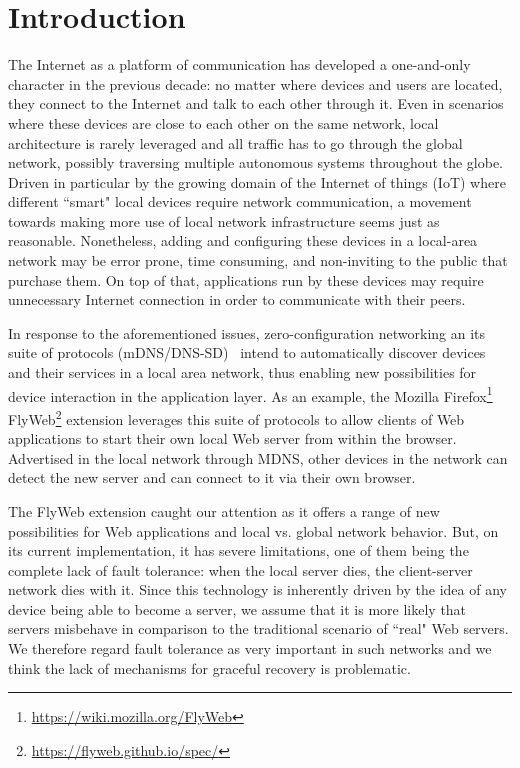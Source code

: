 \section{Introduction}
\label{sec:introduction}

 

The Internet as a platform of communication has developed a one-and-only character in the previous decade: no matter where devices and users are located, they connect to the Internet and talk to each other through it. Even in scenarios where these devices are close to each other on the same network, local architecture is rarely leveraged and all traffic has to go through the global network, possibly traversing multiple autonomous systems throughout the globe. Driven in particular by the growing domain of the Internet of things (IoT) where different ``smart" local devices require network communication, a movement towards making more use of local network infrastructure seems just as reasonable. Nonetheless, adding and configuring these devices in a local-area network may be error prone, time consuming, and non-inviting to the public that purchase them. On top of that, applications run by these devices may require unnecessary Internet connection in order to communicate with their peers. 


In response to the aforementioned issues, zero-configuration networking an its suite of protocols (mDNS/DNS-SD)~\cite{rfc6762,rfc6763} intend to automatically discover devices and their services in a local area network, thus enabling new possibilities for device interaction in the application layer. 
As an example, the Mozilla Firefox\footnote{\url{https://wiki.mozilla.org/FlyWeb}} FlyWeb\footnote{\url{https://flyweb.github.io/spec/}} extension leverages this suite of protocols to allow clients of Web applications to start their own local Web server from within the browser.
Advertised in the local network through MDNS, other devices in the network can detect the new server and can connect to it via their own browser. 


The FlyWeb extension caught our attention as it offers a range of new possibilities for Web applications and local vs. global network behavior. But, on its current implementation, it has severe limitations, one of them being the complete lack of fault tolerance: when the local server dies, the client-server network dies with it. Since this technology is inherently driven by the idea of any device being able to become a server, we assume that it is more likely that servers misbehave in comparison to the traditional scenario of ``real" Web servers. We therefore regard fault tolerance as very important in such networks and we think the lack of mechanisms for graceful recovery is problematic.


